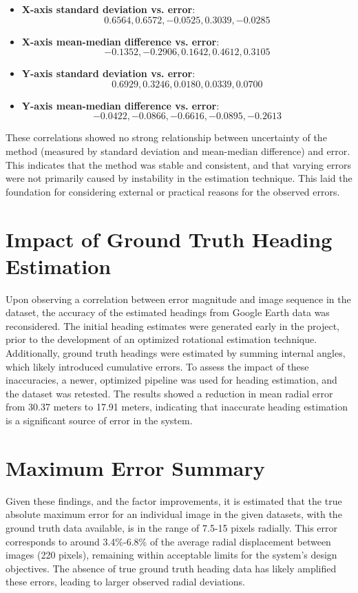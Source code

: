 \begin{itemize}
    \item \textbf{X-axis standard deviation vs. error}: \[0.6564, 0.6572, -0.0525, 0.3039, -0.0285\]
    \item \textbf{X-axis mean-median difference vs. error}: \[-0.1352, -0.2906, 0.1642, 0.4612, 0.3105\]
    \item \textbf{Y-axis standard deviation vs. error}: \[0.6929, 0.3246, 0.0180, 0.0339, 0.0700\]
    \item \textbf{Y-axis mean-median difference vs. error}: \[-0.0422, -0.0866, -0.6616, -0.0895, -0.2613\]
\end{itemize}

These correlations showed no strong relationship between uncertainty of the method (measured by standard deviation and mean-median difference) and error. This indicates that the method was stable and consistent, and that varying errors were not primarily caused by instability in the estimation technique. This laid the foundation for considering external or practical reasons for the observed errors.

\section{Impact of Ground Truth Heading Estimation}

Upon observing a correlation between error magnitude and image sequence in the dataset, the accuracy of the estimated headings from Google Earth data was reconsidered. The initial heading estimates were generated early in the project, prior to the development of an optimized rotational estimation technique. Additionally, ground truth headings were estimated by summing internal angles, which likely introduced cumulative errors. To assess the impact of these inaccuracies, a newer, optimized pipeline was used for heading estimation, and the dataset was retested. The results showed a reduction in mean radial error from 30.37 meters to 17.91 meters, indicating that inaccurate heading estimation is a significant source of error in the system.

\section{Maximum Error Summary}

Given these findings, and the factor improvements, it is estimated that the true absolute maximum error for an individual image in the given datasets, with the ground truth data available, is in the range of 7.5-15 pixels radially. This error corresponds to around 3.4\%-6.8\% of the average radial displacement between images (220 pixels), remaining within acceptable limits for the system's design objectives. The absence of true ground truth heading data has likely amplified these errors, leading to larger observed radial deviations.















